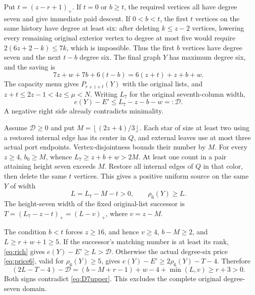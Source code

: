 \documentclass[11pt,a4paper]{article}
\newcommand{\floor}[1]{\left\lfloor#1\right\rfloor}
\theoremstyle{definition}
\begin{document}
Put $t=(z-r+1)_+$. If $t=0$ or $b\ge t$, the required vertices all have degree seven and give immediate paid descent. If $0<b<t$, the first $t$ vertices on the same history have degree at least six: after deleting $k\le z-2$ vertices, lowering every remaining original exterior vertex to degree at most five would require
$2(6z+2-k)\le7k$, which is impossible. Thus the first $b$ vertices have degree seven and the next $t-b$ degree six. The final graph $Y$ has maximum degree six, and the saving is
\[
7z+w+7b+6(t-b)=6(z+t)+z+b+w.
\]
The capacity menu gives $P_{r+z+t}(Y)$ with the original lists, and
$z+t\le2z-1<4z\le\mu<N$. Writing $L_7$ for the original seventh-column width,
\begin{equation}\label{eq:D7upper}
e(Y)-E'\le L_7-z-b-w=:\mathcal D.
\end{equation}
A negative right side already contradicts minimality.

Assume $\mathcal D\ge0$ and put $M=\floor{(2z+4)/3}$. Each star of size at least two using a restored internal edge has its center in $Q$, and external leaves use at most three actual port endpoints. Vertex-disjointness bounds their number by $M$. For every $z\ge4$, $b_0\ge M$, whence $L_7\ge z+b+w>2M$. At least one count in a pair attaining height seven exceeds $M$. Restore all internal edges of $Q$ in that color, then delete the same $t$ vertices. This gives a positive uniform source on the same $Y$ of width
\[
L=L_7-M-t>0,\qquad \rho_6(Y)\ge L.
\]
The height-seven width of the fixed original-list successor is
$T=(L_7-z-t)_+=(L-v)_+$, where $v=z-M$.

The condition $b<t$ forces $z\ge16$, and hence
$v\ge4$, $b-M\ge2$, and $L\ge r+w+1\ge5$. If the successor's matching number is at least its rank, \eqref{eq:rich} gives $e(Y)-E'\ge L>\mathcal D$.
Otherwise the actual degree-six price \eqref{eq:price6}, valid for $\rho_6(Y)\ge5$, gives
$e(Y)-E'\ge2\rho_6(Y)-T-4$. Therefore
\[
(2L-T-4)-\mathcal D
=(b-M+r-1)+w-4+\min(L,v)\ge r+3>0.
\]
Both signs contradict \eqref{eq:D7upper}. This excludes the complete original degree-seven domain.
\end{document}
